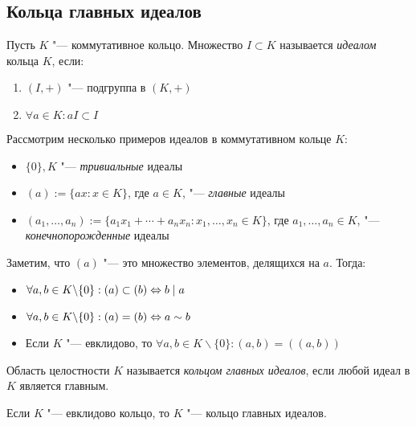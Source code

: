 \subsection{Кольца главных идеалов}

\begin{definition}
	Пусть $K$ "--- коммутативное кольцо. Множество $I \subset K$ называется \textit{идеалом} кольца $K$, если:
	\begin{enumerate}
		\item $(I, +)$ "--- подгруппа в $(K, +)$
		\item $\forall a \in K: aI \subset I$
	\end{enumerate}
\end{definition}

\begin{example}
	Рассмотрим несколько примеров идеалов в коммутативном кольце $K$:
	\begin{itemize}
		\item $\{0\}, K$ "--- \textit{тривиальные} идеалы
		\item $(a) := \{ax : x \in K\}$, где $a \in K$, "--- \textit{главные} идеалы
		\item $(a_1, \dotsc, a_n) := \{a_1x_1 + \dotsb + a_nx_n : x_1, \dotsc, x_n \in K\}$, где $a_1, \dotsc, a_n \in K$, "--- \textit{конечнопорожденные} идеалы
	\end{itemize}
\end{example}

\begin{note}
	Заметим, что $(a)$ "--- это множество элементов, делящихся на $a$. Тогда:
	\begin{itemize}
		\item $\forall a, b \in K \backslash \{0\}: (a) \subset (b) \Leftrightarrow b \mid a$
		\item $\forall a, b \in K \backslash \{0\}: (a) = (b) \Leftrightarrow a \sim b$
		\item Если $K$ "--- евклидово, то $\forall a, b \in K \backslash \{0\}: (a, b) = ((a, b))$
	\end{itemize}
\end{note}

\begin{definition}
	Область целостности $K$ называется \textit{кольцом главных идеалов}, если любой идеал в $K$ является главным.
\end{definition}

\begin{theorem}
	Если $K$ "--- евклидово кольцо, то $K$ "--- кольцо главных идеалов.
\end{theorem}

